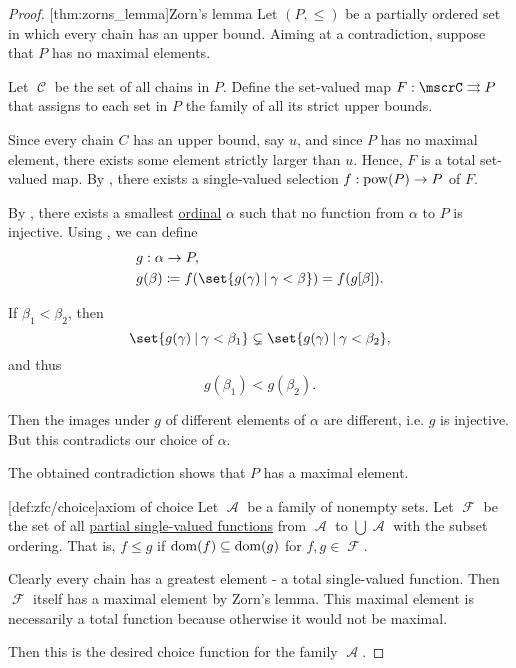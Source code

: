 \begin{proof}
  [thm:zorns_lemma]{Zorn's lemma} Let \( (P, \leq) \) be a partially ordered set in which every chain has an upper bound. Aiming at a contradiction, suppose that \( P \) has no maximal elements.

  Let \( \mscrC \) be the set of all chains in \( P \). Define the set-valued map \( F: \mscrC \multto P \) that assigns to each set in \( P \) the family of all its strict upper bounds.

  Since every chain \( C \) has an upper bound, say \( u \), and since \( P \) has no maximal element, there exists some element strictly larger than \( u \). Hence, \( F \) is a total set-valued map. By , there exists a single-valued selection \( f: \operatorname{pow}(P) \to P \) of \( F \).

  By , there exists a smallest \hyperref[def:ordinal]{ordinal} \( \alpha \) such that no function from \( \alpha \) to \( P \) is injective. Using , we can define
  \begin{equation*}
    \begin{aligned}
      &g: \alpha \to P, \\
      &g(\beta) \coloneqq f(\set{ g(\gamma) \given \gamma < \beta }) = f(g[\beta]). \\
    \end{aligned}
  \end{equation*}

  If \( \beta_1 < \beta_2 \), then
  \begin{equation*}
    \set{ g(\gamma) \given \gamma < \beta_1 }
    \subsetneq
    \set{ g(\gamma) \given \gamma < \beta_2 },
  \end{equation*}
  and thus
  \begin{equation*}
    g(\beta_1) < g(\beta_2).
  \end{equation*}

  Then the images under \( g \) of different elements of \( \alpha \) are different, i.e. \( g \) is injective. But this contradicts our choice of \( \alpha \).

  The obtained contradiction shows that \( P \) has a maximal element.

  [def:zfc/choice]{axiom of choice} Let \( \mscrA \) be a family of nonempty sets. Let \( \mscrF \) be the set of all \hyperref[def:set_valued_map/partial]{partial single-valued functions} from \( \mscrA \) to \( \bigcup \mscrA \) with the subset ordering. That is, \( f \leq g \) if \( \operatorname{dom}(f) \subseteq \operatorname{dom}(g) \) for \( f, g \in \mscrF \).

  Clearly every chain has a greatest element - a total single-valued function. Then \( \mscrF \) itself has a maximal element by Zorn's lemma. This maximal element is necessarily a total function because otherwise it would not be maximal.

  Then this is the desired choice function for the family \( \mscrA \).
\end{proof}
